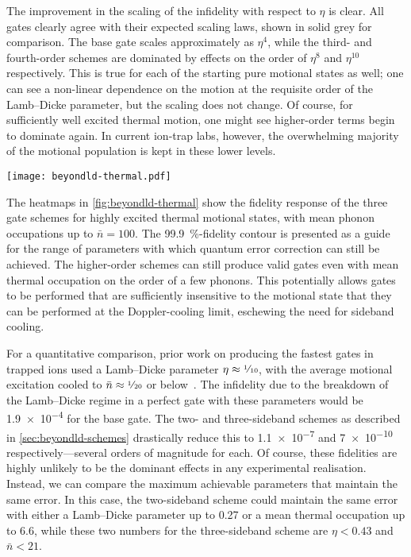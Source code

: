 The improvement in the scaling of the infidelity with respect to $\eta$ is clear.
All gates clearly agree with their expected scaling laws, shown in solid grey for comparison.
The base gate scales approximately as $\eta^4$, while the third- and fourth-order schemes are dominated by effects on the order of $\eta^8$ and $\eta^{10}$ respectively.
This is true for each of the starting pure motional states as well; one can see a non-linear dependence on the motion at the requisite order of the Lamb--Dicke parameter, but the scaling does not change.
Of course, for sufficiently well excited thermal motion, one might see higher-order terms begin to dominate again.
In current ion-trap labs, however, the overwhelming majority of the motional population is kept in these lower levels.

\begin{figure*}%
    \texttt{[image: beyondld-thermal.pdf]}%
    \caption[Performance of the strongly coupled hot M\o lmer--S\o rensen gate]{\label{fig:beyondld-thermal}%
        Heatmaps of the gate infidelity for a thermal motional state with varying mean phonon occupation and Lamb--Dicke parameter.
        The three plots correspond to (a) the base gate, (b) the third-order two-sideband scheme, and (c) the fourth-order three-sideband scheme.
        Contours denote infidelities of \num{e-3} (solid) and \num{e-5} (dashed).
    }%
\end{figure*}

The heatmaps in \cref{fig:beyondld-thermal} show the fidelity response of the three gate schemes for highly excited thermal motional states, with mean phonon occupations up to $\bar n = 100$.
The \qty{99.9}{\percent}-fidelity contour is presented as a guide for the range of parameters with which quantum error correction can still be achieved.
The higher-order schemes can still produce valid gates even with mean thermal occupation on the order of a few phonons.
This potentially allows gates to be performed that are sufficiently insensitive to the motional state that they can be performed at the Doppler-cooling limit, eschewing the need for sideband cooling.

For a quantitative comparison, prior work on producing the fastest gates in trapped ions used a Lamb--Dicke parameter $\eta \approx \text{\sfrac1{10}}$, with the average motional excitation cooled to $\bar n \approx \text{\sfrac1{20}}$ or below~\cite{Schaefer2018}.
The infidelity due to the breakdown of the Lamb--Dicke regime in a perfect gate with these parameters would be \num{1.9e-4} for the base gate.
The two- and three-sideband schemes as described in \cref{sec:beyondld-schemes} drastically reduce this to \num{1.1e-7} and \num{7e-10} respectively---several orders of magnitude for each.
Of course, these fidelities are highly unlikely to be the dominant effects in any experimental realisation.
Instead, we can compare the maximum achievable parameters that maintain the same error.
In this case, the two-sideband scheme could maintain the same error with either a Lamb--Dicke parameter up to \num{0.27} or a mean thermal occupation up to \num{6.6}, while these two numbers for the three-sideband scheme are $\eta < 0.43$ and $\bar n < 21$.


